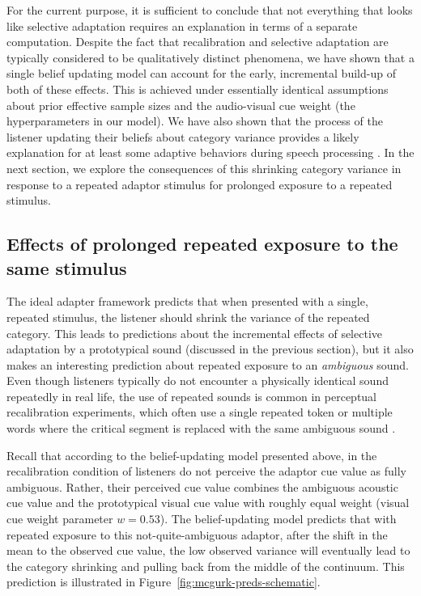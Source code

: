 \label{r1-computation-mechanism}
For the current purpose, it is sufficient to conclude that not everything that looks like selective adaptation requires an explanation in terms of a separate computation.
Despite the fact that recalibration and selective adaptation are typically considered to be qualitatively distinct phenomena, we have shown that a single belief updating model  can account for the early, incremental build-up of both of these effects.  This is achieved under essentially identical assumptions about prior effective sample sizes and the audio-visual cue weight (the hyperparameters in our model).  We have also shown that the process of the listener updating their beliefs about category variance provides a likely explanation for at least some adaptive behaviors during speech processing \autocite[see also][]{Clayards2008}.
In the next section, we explore the consequences of this shrinking category variance in response to a repeated adaptor stimulus for prolonged exposure to a repeated stimulus.



\subsection{Effects of prolonged repeated exposure to the same stimulus}
\label{sec:effects-long-term}


The ideal adapter framework predicts that when presented with a single, repeated stimulus, the listener should shrink the variance of the repeated category.  This leads to predictions about the incremental effects of selective adaptation by a prototypical sound (discussed in the previous section), but it also makes an interesting prediction about repeated exposure to an \emph{ambiguous} sound.  Even though listeners typically do not encounter a physically identical sound repeatedly in real life, the use of repeated sounds is common in perceptual recalibration experiments, which often use a single repeated token \autocite[e.g.,][]{Bertelson2003,Vroomen2004} or multiple words where the critical segment is replaced with the same ambiguous sound \autocites[e.g.,][]{Norris2003,Samuel2001}[but see][]{Kraljic2005,Reinisch2014}.

Recall that according to the belief-updating model presented above, in the recalibration condition of \textcite{Vroomen2007} listeners do not perceive the adaptor cue value as fully ambiguous.  Rather, their perceived cue value combines the ambiguous acoustic cue value and the prototypical visual cue value with roughly equal weight (visual cue weight parameter $w=0.53$).  The belief-updating model predicts that with repeated exposure to this not-quite-ambiguous adaptor, after the shift in the mean to the observed cue value, the low observed variance will eventually lead to the category shrinking and pulling back from the middle of the continuum. This prediction is illustrated in Figure~\ref{fig:mcgurk-preds-schematic}.

